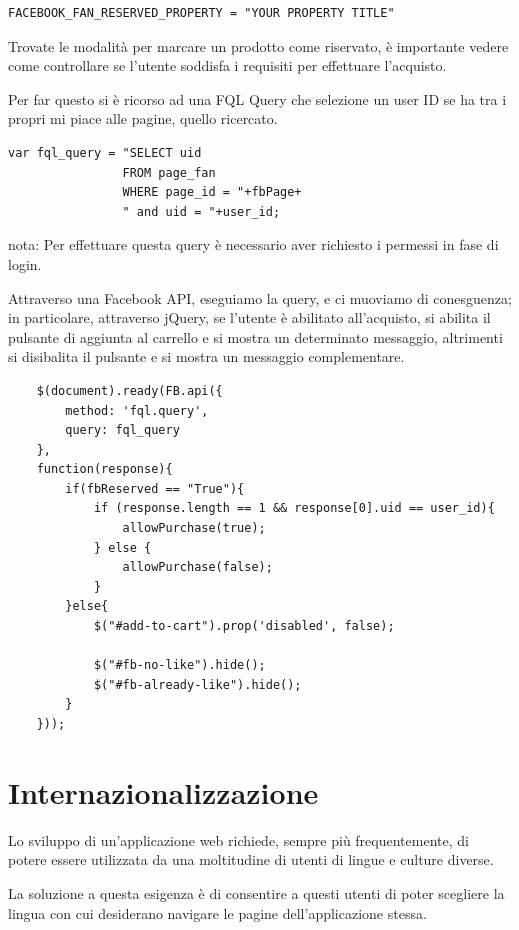 \begin{lstlisting}
FACEBOOK_FAN_RESERVED_PROPERTY = "YOUR PROPERTY TITLE"
\end{lstlisting}

Trovate le modalità per marcare un prodotto come riservato, è importante vedere come controllare se l'utente soddisfa i requisiti per effettuare l'acquisto.

Per far questo si è ricorso ad una FQL Query che selezione un user ID se ha tra i propri mi piace alle pagine, quello ricercato.

\begin{lstlisting}
var fql_query = "SELECT uid 
				FROM page_fan 
				WHERE page_id = "+fbPage+
				" and uid = "+user_id;
\end{lstlisting}

nota: Per effettuare questa query è necessario aver richiesto i permessi in fase di login. 

Attraverso una Facebook API, eseguiamo la query, e ci muoviamo di conesguenza; in particolare, attraverso jQuery, se l'utente è abilitato all'acquisto, si abilita il pulsante di aggiunta al carrello e si mostra un determinato messaggio, altrimenti si disibalita il pulsante e si mostra un messaggio complementare.


\begin{lstlisting}
    $(document).ready(FB.api({
        method: 'fql.query',
        query: fql_query
    },
    function(response){
        if(fbReserved == "True"){
            if (response.length == 1 && response[0].uid == user_id){
                allowPurchase(true);
            } else {
                allowPurchase(false);
            }
        }else{
            $("#add-to-cart").prop('disabled', false);

            $("#fb-no-like").hide();
            $("#fb-already-like").hide();
        }
    }));
\end{lstlisting}

\section{Internazionalizzazione}
Lo sviluppo di un’applicazione web richiede, sempre più frequentemente, di potere essere utilizzata da una moltitudine di utenti di lingue e culture diverse.

La soluzione a questa esigenza è di consentire a questi utenti di poter scegliere la lingua con cui desiderano navigare le pagine dell’applicazione stessa.

